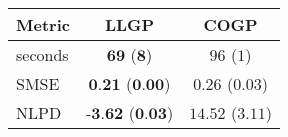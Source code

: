 \begin{tabular}{lcc}\toprule
Metric & LLGP & COGP\\
\midrule
seconds & $\textbf{69}$ ($\textbf{8}$) & $96$ ($1$)\\
SMSE & $\textbf{0.21}$ ($\textbf{0.00}$) & $0.26$ ($0.03$)\\
NLPD & $\textbf{-3.62}$ ($\textbf{0.03}$) & $14.52$ ($3.11$)\\

\bottomrule
\end{tabular}
